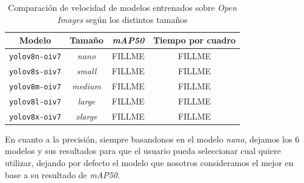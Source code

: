 \documentclass[a4paper]{article}
\begin{document}
\begin{table}[H]
\centering
\renewcommand{\arraystretch}{1.3}
\begin{tabular}{c c c c}
 \hline
 Modelo & Tamaño & \textit{mAP50} & Tiempo por cuadro \\
 \hline\hline
 \texttt{yolov8n-oiv7} & \textit{nano}   & FILLME & FILLME \\ \hline
 \texttt{yolov8s-oiv7} & \textit{small}  & FILLME & FILLME \\ \hline
 \texttt{yolov8m-oiv7} & \textit{medium} & FILLME & FILLME \\ \hline
 \texttt{yolov8l-oiv7} & \textit{large}  & FILLME & FILLME \\ \hline
 \texttt{yolov8x-oiv7} & \textit{xlarge} & FILLME & FILLME \\ \hline
\end{tabular}
\caption{Comparación de velocidad de modelos entrenados sobre \textit{Open Images} según los distintos tamaños}
\end{table}

En cuanto a la precisión, siempre basandonos en el modelo \textit{nano}, dejamos los 6 modelos y sus resultados para que el usuario pueda seleccionar cual quiere utilizar, dejando por defecto el modelo que nosotros consideramos el mejor en base a su resultado de \textit{mAP50}.

\begin{table}[H]
\renewcommand{\arraystretch}{1.2}
\caption{Comparación de precisión de los modelos finales}
\end{table}
\end{document}

